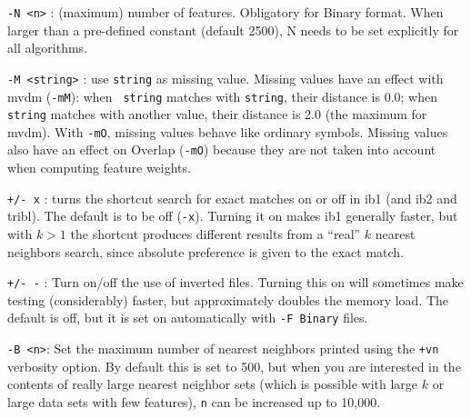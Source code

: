 \documentclass{report}
\begin{document}
\begin{description}

\item {\tt -N <n>} : (maximum) number of features. Obligatory for
Binary format. When larger than a pre-defined constant (default 2500),
N needs to be set explicitly for all algorithms.

\item {\tt -M <string>} : use {\tt string} as missing value. Missing
values have an effect with {\sc mvdm} ({\tt -mM}): when {\tt
string} matches with {\tt string}, their distance is 0.0; when {\tt
string} matches with another value, their distance is 2.0 (the maximum
for {\sc mvdm}). With {\tt -mO}, missing values behave like ordinary
symbols. Missing values also have an effect on Overlap ({\tt -mO})
because they are not taken into account when computing feature
weights. 

\item {\tt +/- x} : turns the shortcut search for exact matches on or
off in {\sc ib1} (and {\sc ib2} and {\sc tribl}). The default is to be
off ({\tt -x}). Turning it on makes {\sc ib1} generally faster, but
with $k>1$ the shortcut produces different results from a ``real'' $k$
nearest neighbors search, since absolute preference is given to the
exact match.

\item {\tt +/- -} : Turn on/off the use of inverted files. Turning
this on will sometimes make testing (considerably) faster, but
approximately doubles the memory load. The default is off, but it is
set on automatically with {\tt -F Binary} files.

\item {\tt -B <n>}: Set the maximum number of nearest neighbors
printed using the {\tt +vn} verbosity option. By default this is set
to 500, but when you are interested in the contents of really large
nearest neighbor sets (which is possible with large $k$ or large data
sets with few features), {\tt n} can be increased up to 10,000.

\end{description}

\clearpage



\end{document}
